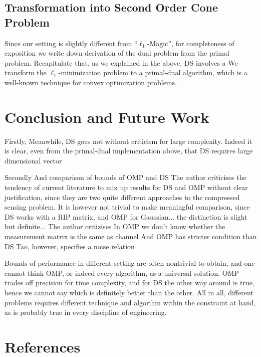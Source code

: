 \documentclass[12pt]{article}
\begin{document}
\subsection{Transformation into Second Order Cone Problem}

Since our setting is slightly different from ``\(\ell_1\)-Magic'', for completeness of exposition we write down derivation of the dual problem from the primal problem.
Recapitulate that, as we explained in the above, DS involves a 
We transform the \(\ell_1\)-minimization problem to a primal-dual algorithm, which is a well-known technique for convex optimization problems.




\section{Conclusion and Future Work}

Firstly,
Meanwhile, DS goes not without criticism for large complexity.
Indeed it is clear, even from the primal-dual implementation above, that DS requires large dimensional vector

Secondly
And comparison of bounds of OMP and DS
The author criticises the tendency of current literature to mix up results for DS and OMP without clear justification, since they are two quite different approaches to the compressed sensing problem.
It is however not trivial to make meaningful comparison, since DS works with a RIP matrix, and OMP for Gaussian... the distinction is slight but definite...
The author critizises In OMP we don't know whether the measurement matrix is the same as channel
And OMP has stricter condition than DS
Tao, however, specifies a noise relation

Bounds of performance in different setting are often nontrivial to obtain, and one cannot think OMP, or indeed every algorithm, as a universal solution.
OMP trades off precision for time complexity, and for DS the other way around is true, hence we cannot say which is definitely better than the other.
All in all, different problems requires different technique and algorihm within the constraint at hand, as is probably true in every discipline of engineering.

\section{References}
\end{document}
